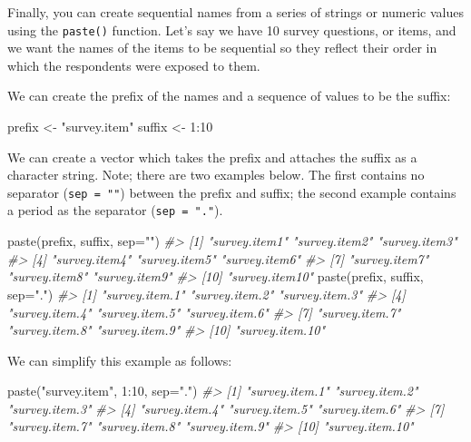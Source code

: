 \documentclass[
]{book}
\newenvironment{Shaded}{\begin{snugshade}}{\end{snugshade}}
\newcommand{\AttributeTok}[1]{\textcolor[rgb]{0.77,0.63,0.00}{#1}}
\newcommand{\CommentTok}[1]{\textcolor[rgb]{0.56,0.35,0.01}{\textit{#1}}}
\newcommand{\DecValTok}[1]{\textcolor[rgb]{0.00,0.00,0.81}{#1}}
\newcommand{\FunctionTok}[1]{\textcolor[rgb]{0.00,0.00,0.00}{#1}}
\newcommand{\NormalTok}[1]{#1}
\newcommand{\OtherTok}[1]{\textcolor[rgb]{0.56,0.35,0.01}{#1}}
\newcommand{\SpecialCharTok}[1]{\textcolor[rgb]{0.00,0.00,0.00}{#1}}
\newcommand{\StringTok}[1]{\textcolor[rgb]{0.31,0.60,0.02}{#1}}
\begin{document}
Finally, you can create sequential names from a series of strings or numeric values using the \texttt{paste()} function. Let's say we have 10 survey questions, or items, and we want the names of the items to be sequential so they reflect their order in which the respondents were exposed to them.

We can create the prefix of the names and a sequence of values to be the suffix:

\begin{Shaded}
\begin{Highlighting}[]
\NormalTok{prefix }\OtherTok{\textless{}{-}} \StringTok{"survey.item"}
\NormalTok{suffix }\OtherTok{\textless{}{-}} \DecValTok{1}\SpecialCharTok{:}\DecValTok{10}
\end{Highlighting}
\end{Shaded}

We can create a vector which takes the prefix and attaches the suffix as a character string. Note; there are two examples below. The first contains no separator (\texttt{sep\ =\ ""}) between the prefix and suffix; the second example contains a period as the separator (\texttt{sep\ =\ "."}).

\begin{Shaded}
\begin{Highlighting}[]
\FunctionTok{paste}\NormalTok{(prefix, suffix, }\AttributeTok{sep=}\StringTok{""}\NormalTok{)}
\CommentTok{\#\textgreater{}  [1] "survey.item1"  "survey.item2"  "survey.item3" }
\CommentTok{\#\textgreater{}  [4] "survey.item4"  "survey.item5"  "survey.item6" }
\CommentTok{\#\textgreater{}  [7] "survey.item7"  "survey.item8"  "survey.item9" }
\CommentTok{\#\textgreater{} [10] "survey.item10"}
\FunctionTok{paste}\NormalTok{(prefix, suffix, }\AttributeTok{sep=}\StringTok{"."}\NormalTok{)}
\CommentTok{\#\textgreater{}  [1] "survey.item.1"  "survey.item.2"  "survey.item.3" }
\CommentTok{\#\textgreater{}  [4] "survey.item.4"  "survey.item.5"  "survey.item.6" }
\CommentTok{\#\textgreater{}  [7] "survey.item.7"  "survey.item.8"  "survey.item.9" }
\CommentTok{\#\textgreater{} [10] "survey.item.10"}
\end{Highlighting}
\end{Shaded}

We can simplify this example as follows:

\begin{Shaded}
\begin{Highlighting}[]
\FunctionTok{paste}\NormalTok{(}\StringTok{"survey.item"}\NormalTok{, }\DecValTok{1}\SpecialCharTok{:}\DecValTok{10}\NormalTok{, }\AttributeTok{sep=}\StringTok{"."}\NormalTok{)}
\CommentTok{\#\textgreater{}  [1] "survey.item.1"  "survey.item.2"  "survey.item.3" }
\CommentTok{\#\textgreater{}  [4] "survey.item.4"  "survey.item.5"  "survey.item.6" }
\CommentTok{\#\textgreater{}  [7] "survey.item.7"  "survey.item.8"  "survey.item.9" }
\CommentTok{\#\textgreater{} [10] "survey.item.10"}
\end{Highlighting}
\end{Shaded}
\end{document}
